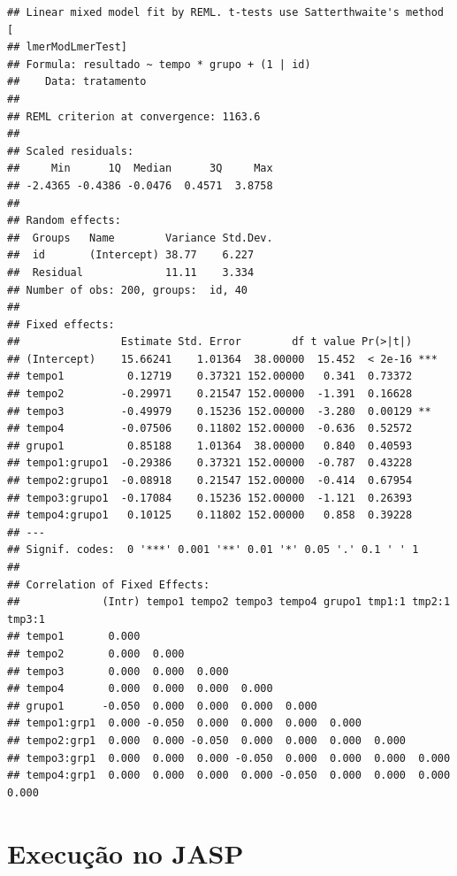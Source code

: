 \documentclass[
]{book}
\begin{document}
\begin{verbatim}
## Linear mixed model fit by REML. t-tests use Satterthwaite's method [
## lmerModLmerTest]
## Formula: resultado ~ tempo * grupo + (1 | id)
##    Data: tratamento
## 
## REML criterion at convergence: 1163.6
## 
## Scaled residuals: 
##     Min      1Q  Median      3Q     Max 
## -2.4365 -0.4386 -0.0476  0.4571  3.8758 
## 
## Random effects:
##  Groups   Name        Variance Std.Dev.
##  id       (Intercept) 38.77    6.227   
##  Residual             11.11    3.334   
## Number of obs: 200, groups:  id, 40
## 
## Fixed effects:
##                Estimate Std. Error        df t value Pr(>|t|)    
## (Intercept)    15.66241    1.01364  38.00000  15.452  < 2e-16 ***
## tempo1          0.12719    0.37321 152.00000   0.341  0.73372    
## tempo2         -0.29971    0.21547 152.00000  -1.391  0.16628    
## tempo3         -0.49979    0.15236 152.00000  -3.280  0.00129 ** 
## tempo4         -0.07506    0.11802 152.00000  -0.636  0.52572    
## grupo1          0.85188    1.01364  38.00000   0.840  0.40593    
## tempo1:grupo1  -0.29386    0.37321 152.00000  -0.787  0.43228    
## tempo2:grupo1  -0.08918    0.21547 152.00000  -0.414  0.67954    
## tempo3:grupo1  -0.17084    0.15236 152.00000  -1.121  0.26393    
## tempo4:grupo1   0.10125    0.11802 152.00000   0.858  0.39228    
## ---
## Signif. codes:  0 '***' 0.001 '**' 0.01 '*' 0.05 '.' 0.1 ' ' 1
## 
## Correlation of Fixed Effects:
##             (Intr) tempo1 tempo2 tempo3 tempo4 grupo1 tmp1:1 tmp2:1 tmp3:1
## tempo1       0.000                                                        
## tempo2       0.000  0.000                                                 
## tempo3       0.000  0.000  0.000                                          
## tempo4       0.000  0.000  0.000  0.000                                   
## grupo1      -0.050  0.000  0.000  0.000  0.000                            
## tempo1:grp1  0.000 -0.050  0.000  0.000  0.000  0.000                     
## tempo2:grp1  0.000  0.000 -0.050  0.000  0.000  0.000  0.000              
## tempo3:grp1  0.000  0.000  0.000 -0.050  0.000  0.000  0.000  0.000       
## tempo4:grp1  0.000  0.000  0.000  0.000 -0.050  0.000  0.000  0.000  0.000
\end{verbatim}

\hypertarget{execuuxe7uxe3o-no-jasp-13}{%
\section{Execução no JASP}\label{execuuxe7uxe3o-no-jasp-13}}
\end{document}
